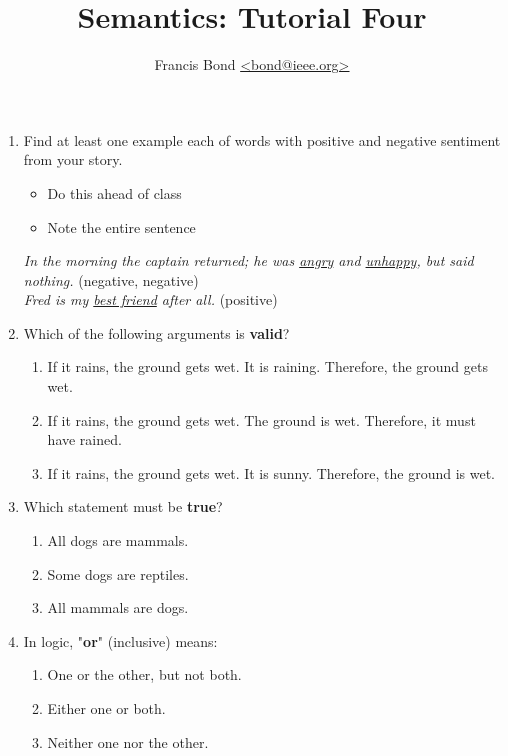 \documentclass[a4paper]{article}
\title{Semantics: Tutorial Four}
\author{Francis Bond \url{<bond@ieee.org>}}
\date{}%
\newcommand{\ul}[1]{\uline{#1}}
\begin{document}
\maketitle

\begin{enumerate}
  
\item Find at least one example each of words with positive and
  negative sentiment from your story.
  \begin{itemize}
  \item Do this ahead of class
  \item Note the entire sentence
  \end{itemize}
   \emph{In the morning the captain returned; he was \ul{angry} and \ul{unhappy}, but said nothing.} (negative, negative)
  \\ \emph{Fred is my \ul{best friend} after all.} (positive)


\item \label{q:valid-argument} Which of the following arguments is \textbf{valid}?
\begin{enumerate}
\item If it rains, the ground gets wet. It is raining. Therefore, the ground gets wet. \label{q:valid-argument-a}
\item If it rains, the ground gets wet. The ground is wet. Therefore, it must have rained.
\item If it rains, the ground gets wet. It is sunny. Therefore, the ground is wet.
\end{enumerate}

\item \label{q:true-statement} Which statement must be \textbf{true}?
\begin{enumerate}
\item All dogs are mammals. \label{q:true-statement-a}
\item Some dogs are reptiles.
\item All mammals are dogs.
\end{enumerate}

\item \label{q:inclusive-or} In logic, "\textbf{or}" (inclusive) means:
\begin{enumerate}
\item One or the other, but not both.
\item Either one or both. \label{q:inclusive-or-b}
\item Neither one nor the other.
\end{enumerate}


\end{enumerate}
\end{document}
